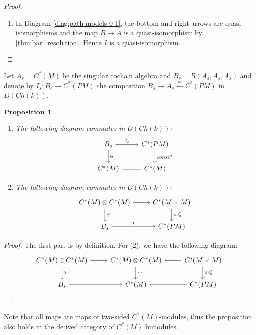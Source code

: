 \documentclass{scrartcl}
\theoremstyle{plain}
\newtheorem{proposition}[theorem]{Proposition}
\theoremstyle{definition}
\newcommand{\cupp}{\mathbin{\smile}}
\newcommand{\quiso}{\simeq}
\let\xfrom\xleftarrow
\begin{document}
\begin{proof}
\begin{enumerate}
\item In Diagram \ref{diag:path-models-0-1}, the bottom and right arrows are quasi-isomorphisms and the map $B\to A$ is a quasi-isomorphism by \cref{thm:bar_resolution}. Hence $I$ is a quasi-isomorphism.
\end{enumerate}
\end{proof}


Let $A_s = C^*(M)$ be the singular cochain algebra and $B_s = B(A_s, A_s, A_s)$ and denote by $I_s\colon B_c\to C^*(PM)$ the composition $B_s\to A_s\xfrom{\quiso} C^*(PM)$ in $D(Ch(k))$.
\begin{proposition}
    \begin{enumerate}
        \item The following diagram commutes in $D(Ch(k))$: 
        \begin{equation}
        \begin{tikzcd}
            B_s \rar["I_c"] \dar["\alpha"] & C^*(PM) \dar["const^*"] \\
            C^*(M) \rar[equal] & C^*(M)
        \end{tikzcd}
        \end{equation}
        \item The following diagram commutes in $D(Ch(k))$:
        \begin{equation}
            \begin{tikzcd}
            C^*(M) \otimes C^*(M) \rar \dar["\beta"] & C^*(M\times M)\dar["ev_{0,1}^*"] \\
            B_s \rar["I"] & C^*(PM)
            \end{tikzcd}
        \end{equation}
    \end{enumerate}
\end{proposition}
\begin{proof}
    The first part is by definition. For (2), we have the following diagram:
    \[\begin{tikzcd}
        C^*(M) \otimes C^*(M) \rar \dar["\beta"] & C^*(M)\otimes C^*(M) \dar["\cupp"] &\lar C^*(M\times M)\dar["ev_{0,1}^*"] \\
        B_s \rar & C^*(M)  & \lar  C^*(PM)
    \end{tikzcd}\]
\end{proof}
Note that all maps are maps of two-sided $C^*(M)$-modules, thus the proposition also holds in the derived category of $C^*(M)$ bimodules. 
\end{document}
